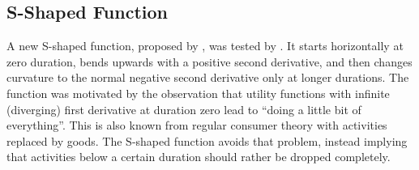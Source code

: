 

\subsection{S-Shaped Function}
\label{sec:s-shaped}
A new S-shaped function, proposed by \citet[][]{Joh_PhDThesis_2004}, was tested by \citet[][p.129ff]{Feil_PhDThesis_2010}. 
It starts horizontally at zero duration, bends upwards with a positive second derivative, and then changes curvature to the normal negative second derivative only at longer durations.  
%
The function was motivated by the observation that utility functions with infinite (\ie diverging) first derivative at duration zero lead to ``doing a little bit of everything''.  This is also known from regular consumer theory with activities replaced by goods.  The S-shaped function avoids that problem, instead implying that activities below a certain duration should rather be dropped completely.
%


